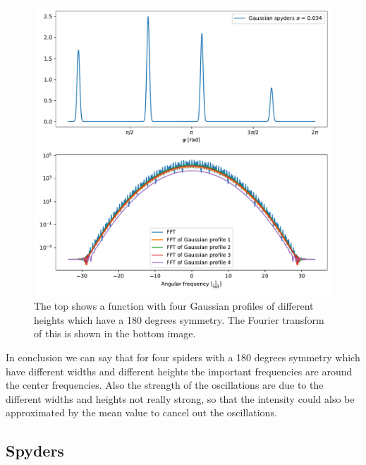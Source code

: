 \begin{figure}[H]
	\centering
		\includegraphics[width=1.0\textwidth]{pics/Gaussian_fourheightspyders.pdf}
		\caption{The top shows a function with four Gaussian profiles of different heights which have a 180 degrees symmetry. The Fourier transform of this is shown in the bottom image.}
		\label{fig:Gaussian_fourheightspyders}
\end{figure}
In conclusion we can say that for four spiders with a 180 degrees symmetry which have different widths and different heights the important frequencies are around the center frequencies. Also the strength of the oscillations are due to the different widths and heights not really strong, so that the intensity could also be approximated by the mean value to cancel out the oscillations.  

\subsection{Spyders}

